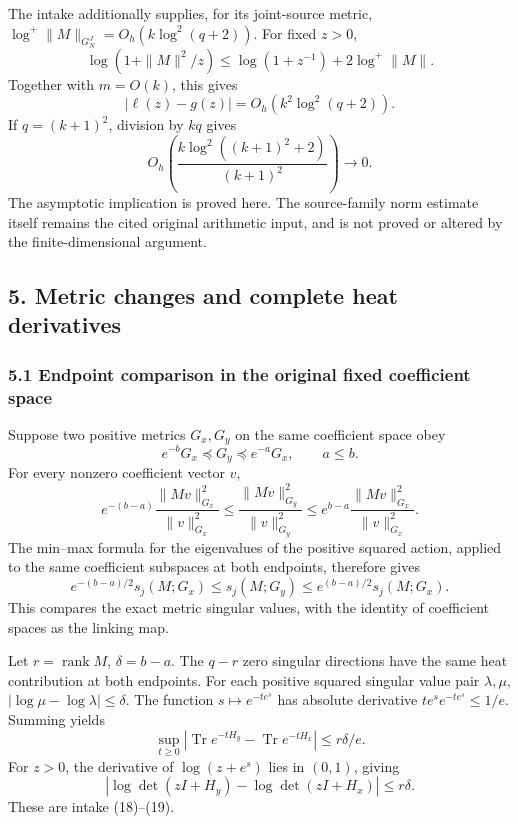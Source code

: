\documentclass[11pt]{article}
\begin{document}
The intake additionally supplies, for its joint-source metric, \(\log^+\|M\|_{G_N^J}=O_h(k\log^2(q+2))\). For fixed \(z>0\), \[
 \log(1+\|M\|^2/z)
 \le\log(1+z^{-1})+2\log^+\|M\|.
\] Together with \(m=O(k)\), this gives \[
 |\ell(z)-g(z)|=O_h(k^2\log^2(q+2)).
\] If \(q=(k+1)^2\), division by \(kq\) gives \[
 O_h\!\left(\frac{k\log^2((k+1)^2+2)}{(k+1)^2}\right)\to0.
\] The asymptotic implication is proved here. The source-family norm estimate itself remains the cited original arithmetic input, and is not proved or altered by the finite-dimensional argument.

\subsection{5. Metric changes and complete heat derivatives}\label{metric-changes-and-complete-heat-derivatives}

\subsubsection{5.1 Endpoint comparison in the original fixed coefficient space}\label{endpoint-comparison-in-the-original-fixed-coefficient-space}

Suppose two positive metrics \(G_x,G_y\) on the same coefficient space obey \[
 e^{-b}G_x\preceq G_y\preceq e^{-a}G_x,\qquad a\le b.
 \tag{UH33}
\] For every nonzero coefficient vector \(v\), \[
 e^{-(b-a)}
 \frac{\|Mv\|_{G_x}^2}{\|v\|_{G_x}^2}
 \le
 \frac{\|Mv\|_{G_y}^2}{\|v\|_{G_y}^2}
 \le
 e^{b-a}
 \frac{\|Mv\|_{G_x}^2}{\|v\|_{G_x}^2}.
\] The min--max formula for the eigenvalues of the positive squared action, applied to the same coefficient subspaces at both endpoints, therefore gives \[
 e^{-(b-a)/2}s_j(M;G_x)
 \le s_j(M;G_y)\le
 e^{(b-a)/2}s_j(M;G_x).
 \tag{UH34}
\] This compares the exact metric singular values, with the identity of coefficient spaces as the linking map.

Let \(r=\operatorname{rank}M\), \(\delta=b-a\). The \(q-r\) zero singular directions have the same heat contribution at both endpoints. For each positive squared singular value pair \(\lambda,\mu\), \(|\log\mu-\log\lambda|\le\delta\). The function \(s\mapsto e^{-t e^s}\) has absolute derivative \(te^s e^{-te^s}\le1/e\). Summing yields \[
 \sup_{t\ge0}|\operatorname{Tr}e^{-tH_y}-\operatorname{Tr}e^{-tH_x}|
 \le r\delta/e.
 \tag{UH35}
\] For \(z>0\), the derivative of \(\log(z+e^s)\) lies in \((0,1)\), giving \[
 |\log\det(zI+H_y)-\log\det(zI+H_x)|\le r\delta.
 \tag{UH36}
\] These are intake (18)--(19).
\end{document}
